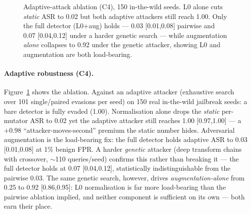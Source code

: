 \documentclass[11pt]{article}
\begin{document}
\begin{figure}[t]
\centering
{}
\caption{Adaptive-attack ablation (C4), 150 in-the-wild seeds. L0 alone cuts \emph{static} ASR to 0.02
but both adaptive attackers still reach 1.00. Only the full detector (L0+aug) holds --- 0.03 [0.01,0.08]
pairwise and 0.07 [0.04,0.12] under a harder genetic search --- while augmentation \emph{alone}
collapses to 0.92 under the genetic attacker, showing L0 and augmentation are both load-bearing.}
\label{fig:adaptive}
\end{figure}

\paragraph{Adaptive robustness (C4).} Figure~\ref{fig:adaptive} shows the ablation. Against an adaptive attacker (exhaustive search over 101
single/paired evasions per seed) on 150 real in-the-wild jailbreak seeds: a bare detector is fully
evaded (1.00). Normalisation alone drops the \emph{static} per-mutator ASR to 0.02 yet the adaptive
attacker still reaches 1.00 [0.97,1.00] --- a $+0.98$ ``attacker-moves-second'' premium the static
number hides. Adversarial augmentation is the load-bearing fix: the full detector holds adaptive ASR
to 0.03 [0.01,0.08] at 1\% benign FPR. A harder \emph{genetic} attacker (deep transform chains with
crossover, $\sim$110 queries/seed) confirms this rather than breaking it --- the full detector holds at
0.07 [0.04,0.12], statistically indistinguishable from the pairwise 0.03. The same genetic search,
however, drives \emph{augmentation-alone} from 0.25 to 0.92 [0.86,0.95]: L0 normalisation is far more
load-bearing than the pairwise ablation implied, and neither component is sufficient on its own --- both
earn their place.
\end{document}
